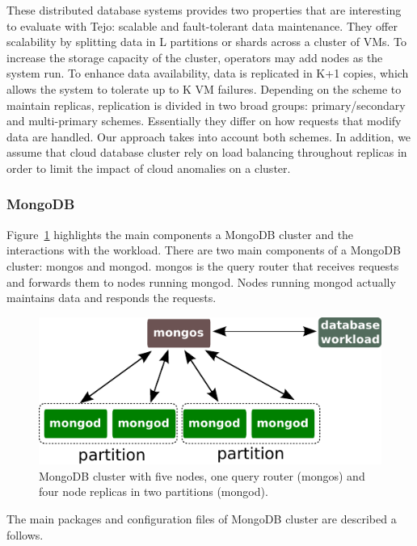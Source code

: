 These distributed database systems provides two properties that are interesting to evaluate with Tejo: scalable and fault-tolerant data maintenance. They offer scalability by splitting data in L partitions or shards across a cluster of VMs. To increase the storage capacity of the cluster, operators may add nodes as the system run. To enhance data availability, data is replicated in K+1 copies, which allows the system to tolerate up to K VM failures. Depending on the scheme to maintain replicas, replication is divided in two broad groups: primary/secondary and multi-primary schemes. Essentially they differ on how requests that modify data are handled. Our approach takes into account both schemes. In addition, we assume that cloud database cluster rely on load balancing throughout replicas in order to limit the impact of cloud anomalies on a cluster.



\subsubsection{MongoDB}
\label{subsub:mongo}

Figure~\ref{fig:mongo_cluster} highlights the main components a MongoDB cluster and the interactions with the workload. There are two main components of a MongoDB cluster: mongos and mongod. mongos is the query router that receives requests and forwards them to nodes running mongod. Nodes running mongod actually maintains data and responds the requests. 

\begin{figure}[!h]
  \centering
     \includegraphics[width=.6\textwidth]{inputs/img/mongo_cluster}
  \caption{MongoDB cluster with five nodes, one query router (mongos) and four node replicas in two partitions (mongod).}
  \label{fig:mongo_cluster}
\end{figure}

The main packages and configuration files of MongoDB cluster are described a follows.

